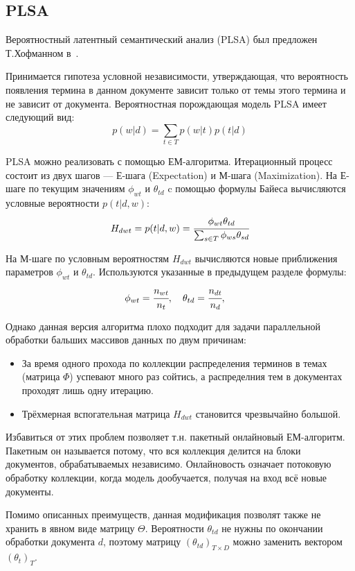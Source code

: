
\subsection{PLSA}\label{plsa_alg}

Вероятностный латентный семантический анализ (PLSA) был предложен Т.Хофманном в~\cite{hofmann_plsa}.

Принимается гипотеза условной независимости, утверждающая, что вероятность появления термина в данном документе зависит только от темы этого термина и не зависит от документа. Вероятностная порождающая модель PLSA имеет следующий вид: 
\begin{equation}\label{eq_generic}
	p(w|d) = \sum_{t \in T} p(w|t) p(t|d)
\end{equation}

PLSA можно реализовать с помощью ЕМ-алгоритма. Итерационный процесс состоит из двух шагов --- Е-шага (Expectation) и М-шага (Maximization). На Е-шаге по текущим значениям $\phi_{wt}$ и $\theta_{td}$ c помощью формулы Байеса вычисляются условные вероятности $p(t|d,w)$:
\[
	H_{dwt} = p(t|d,w) = \cfrac{\phi_{wt}\theta_{td}}{\sum_{s \in T}\phi_{ws}\theta_{sd}}
\]

На М-шаге по условным вероятностям $H_{dwt}$ вычисляются новые приближения параметров $\phi_{wt}$ и $\theta_{td}$. Используются указанные в предыдущем разделе формулы:
\[
	\phi_{wt} = \cfrac{n_{wt}}{n_t}, \quad
	\theta_{td} = \cfrac{n_{dt}}{n_d}, \quad	
\]

Однако данная версия алгоритма плохо подходит для задачи параллельной обработки бальших массивов данных по двум причинам:

\begin{itemize}
	\item За время одного прохода по коллекции распределения терминов в темах (матрица $\Phi$) успевают много раз сойтись, а распределния тем в документах проходят лишь одну итерацию.
	\item Трёхмерная вспогательная матрица $H_{dwt}$ становится чрезвычайно большой.
\end{itemize}

Избавиться от этих проблем позволяет т.н. пакетный онлайновый ЕМ-алгоритм. Пакетным он называется потому, что вся коллекция делится на блоки документов, обрабатываемых независимо. Онлайновость означает потоковую обработку коллекции, когда модель дообучается, получая на вход всё новые документы.

Помимо описанных преимуществ, данная модификация позволят также не хранить в явном виде матрицу $\Theta$. Вероятности $\theta_{td}$ не нужны по окончании обработки документа $d$, поэтому матрицу $(\theta_{td})_{T \times D}$ можно заменить вектором $(\theta_t)_T$.



